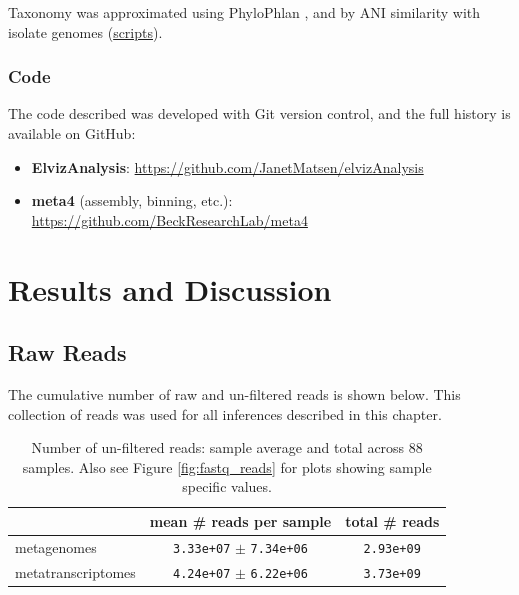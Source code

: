Taxonomy was approximated using PhyloPhlan \cite{segata2013}, and by ANI similarity with isolate genomes (\href{https://github.com/BeckResearchLab/meta4/tree/master/m4b_binning/assembly/bin_info}{scripts}).

\subsubsection{Code}
The code described was developed with Git version control, and the full history is available on GitHub:
\begin{itemize}
    \item \textbf{ElvizAnalysis}: \url{https://github.com/JanetMatsen/elvizAnalysis}
    \item \textbf{meta4} (assembly, binning, etc.): \url{https://github.com/BeckResearchLab/meta4}
\end{itemize}

\section{Results and Discussion}


\subsection{Raw Reads}

The cumulative number of raw and un-filtered reads is shown below.
This collection of reads was used for all inferences described in this chapter.

\begin{table}[H]
\centering
\begin{singlespace}
\caption[Number of un-filtered reads: sample average and total]
	{Number of un-filtered reads: sample average and total across 88 samples.
	Also see Figure \ref{fig:fastq_reads} for plots showing sample specific values.}
\begin{tabular}{l | cc}
        & mean \# reads per sample & total \# reads \\
\midrule
	metagenomes & \texttt{3.33e+07} $\pm$ \texttt{7.34e+06} & \texttt{2.93e+09} \\ %
	metatranscriptomes & \texttt{4.24e+07} $\pm$ \texttt{6.22e+06} &  \texttt{3.73e+09} \\
\end{tabular}
\label{table:sample_read_sizes}
\end{singlespace}
\end{table}



